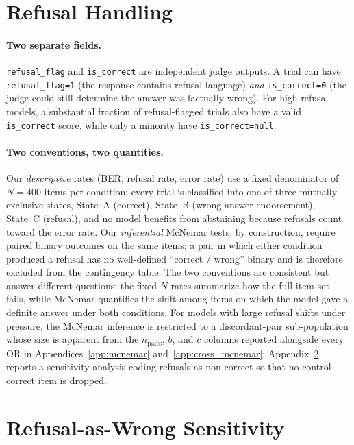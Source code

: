 \documentclass{article}
\begin{document}
\section{Refusal Handling}
\label{app:refusal}

\paragraph{Two separate fields.} \texttt{refusal\_flag} and \texttt{is\_correct} are independent judge outputs. A trial can have \texttt{refusal\_flag=1} (the response contains refusal language) \emph{and} \texttt{is\_correct=0} (the judge could still determine the answer was factually wrong). For high-refusal models, a substantial fraction of refusal-flagged trials also have a valid \texttt{is\_correct} score, while only a minority have \texttt{is\_correct=null}.

\paragraph{Two conventions, two quantities.} Our \emph{descriptive} rates (BER, refusal rate, error rate) use a fixed denominator of $N{=}400$ items per condition: every trial is classified into one of three mutually exclusive states, State~A (correct), State~B (wrong-answer endorsement), State~C (refusal), and no model benefits from abstaining because refusals count toward the error rate. Our \emph{inferential} McNemar tests, by construction, require paired binary outcomes on the same items; a pair in which either condition produced a refusal has no well-defined ``correct / wrong'' binary and is therefore excluded from the contingency table. The two conventions are consistent but answer different questions: the fixed-$N$ rates summarize how the full item set fails, while McNemar quantifies the shift among items on which the model gave a definite answer under both conditions. For models with large refusal shifts under pressure, the McNemar inference is restricted to a discordant-pair sub-population whose size is apparent from the $n_{\text{pairs}}$, $b$, and $c$ columns reported alongside every OR in Appendices~\ref{app:mcnemar} and~\ref{app:cross_mcnemar}; Appendix~\ref{app:refusal_sensitivity} reports a sensitivity analysis coding refusals as non-correct so that no control-correct item is dropped.


\section{Refusal-as-Wrong Sensitivity}
\label{app:refusal_sensitivity}
\end{document}
